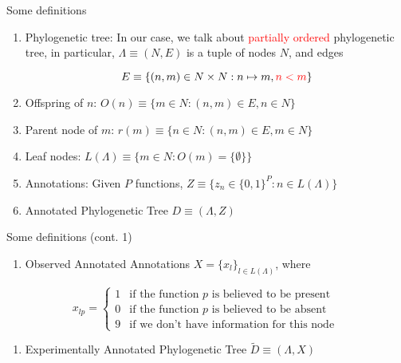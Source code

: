 \documentclass[9pt,ignorenonframetext,]{beamer}
\providecommand{\tightlist}{%
  \setlength{\itemsep}{0pt}\setlength{\parskip}{0pt}}
\newcommand{\phylo}{\Lambda{}} %
\newcommand{\aphylo}{D{}}      %
\newcommand{\aphyloObs}{\tilde \aphylo{}} %
\newcommand{\Ann}{Z{}} %
\newcommand{\ann}{z{}} %
\newcommand{\AnnObs}{X{}}
\newcommand{\annObs}{x{}}
\newcommand{\Leaf}{L{}}
\begin{document}
\begin{frame}{Some definitions}

\begin{enumerate}
\def\labelenumi{\arabic{enumi}.}
\item
  Phylogenetic tree: In our case, we talk about
  \textcolor{red}{partially ordered} phylogenetic tree, in particular,
  \(\phylo\equiv (N,E)\) is a tuple of nodes \(N\), and edges

  \[
  E\equiv \{(n, m) \in N\times N: n\mapsto m, \textcolor{red}{n < m}\}
  \]
\item
  Offspring of \(n\): \(O(n)\equiv\{m\in N: (n, m) \in E, n\in N\}\)
\item
  Parent node of \(m\): \(r(m) \equiv\{n \in N: (n, m) \in E, m\in N\}\)
\item
  Leaf nodes: \(\Leaf(\phylo)\equiv \{m \in N: O(m)=\{\emptyset\}\}\)
\item
  Annotations: Given \(P\) functions,
  \(\Ann \equiv \{\ann_n \in \{0,1\}^P: n\in \Leaf(\phylo)\}\)
\item
  Annotated Phylogenetic Tree \(\aphylo \equiv(\phylo, \Ann)\)
\end{enumerate}

\end{frame}

\begin{frame}{Some definitions (cont. 1)}

\begin{enumerate}
\def\labelenumi{\arabic{enumi}.}
\setcounter{enumi}{6}
\tightlist
\item
  Observed Annotated Annotations
  \(\AnnObs = \{\annObs_l\}_{l\in \Leaf(\phylo)}\), where
\end{enumerate}

\[
\annObs_{lp} = \left\{
\begin{array}{ll}
1 & \mbox{if the function }p\mbox{ is believed to be present}\\
0 & \mbox{if the function }p\mbox{ is believed to be absent}\\
9 & \mbox{if we don't have information for this node }
\end{array}\right.
\]

\begin{enumerate}
\def\labelenumi{\arabic{enumi}.}
\setcounter{enumi}{7}
\tightlist
\item
  Experimentally Annotated Phylogenetic Tree
  \(\aphyloObs\equiv(\phylo, \AnnObs)\)
\end{enumerate}

\end{frame}
\end{document}
